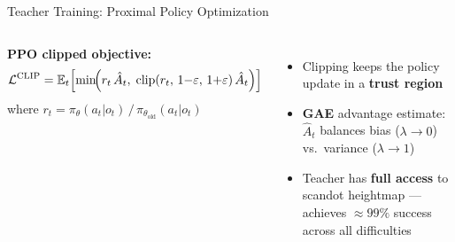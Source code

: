 \documentclass[aspectratio=169,10pt]{beamer}
\begin{document}
\begin{frame}{Teacher Training: Proximal Policy Optimization}
\begin{columns}[T]
  \textbf{PPO clipped objective:}
  {\small
  \[
    \mathcal{L}^{\text{CLIP}} = \mathbb{E}_t\!\left[
      \min\!\Bigl(
        r_t\,\hat{A}_t,\;
        \operatorname{clip}(r_t,\,1{-}\varepsilon,\,1{+}\varepsilon)\,\hat{A}_t
      \Bigr)
    \right]
  \]
  }
  where $r_t = \pi_\theta(a_t|o_t)\,/\,\pi_{\theta_\text{old}}(a_t|o_t)$

  \vspace{0.6em}
  \begin{itemize}
    \setlength\itemsep{0.5em}
    \item Clipping keeps the policy update in a \textbf{trust region}
    \item \textbf{GAE} advantage estimate: $\hat{A}_t$ balances
          bias ($\lambda{\to}0$) vs.\ variance ($\lambda{\to}1$)
    \item Teacher has \textbf{full access} to scandot heightmap ---
          achieves $\approx99\%$ success across all difficulties
  \end{itemize}

\end{columns}
\end{frame}


\end{document}
